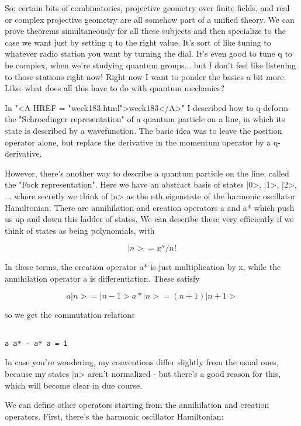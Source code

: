 So: certain bits of combinatorics, projective geometry over finite
fields, and real or complex projective geometry are all somehow part
of a unified theory.  We can prove theorems simultaneously for all
these subjects and then specialize to the case we want just by setting
q to the right value.  It's sort of like tuning to whatever radio
station you want by turning the dial.  It's even good to tune q to 
be complex, when we're studying quantum groups... but I don't feel like
listening to those stations right now!  Right now I want to ponder 
the basics a bit more.  Like: what does all this have to do with quantum 
mechanics?

In "<A HREF = "week183.html">week183</A>" I described how to q-deform the "Schroedinger
representation" of a quantum particle on a line, in which its state is
described by a wavefunction.  The basic idea was to leave the position
operator alone, but replace the derivative in the momentum operator by
a q-derivative.

However, there's another way to describe a quantum particle on the
line, called the "Fock representation".  Here we have an abstract
basis of states |0>, |1>, |2>, ... where secretly we think of |n> as
the nth eigenstate of the harmonic oscillator Hamiltonian.  There are
annihilation and creation operators a and a* which push us up and down
this ladder of states.  We can describe these very efficiently if
we think of states as being polynomials, with


$$

|n> = x^{n} / n!
$$
    
In these terms, the creation operator a* is just multiplication by x,
while the annihilation operator a is differentiation.  These satisfy

$$

 a|n>  =        |n-1>
a*|n>  =  (n+1) |n+1>
$$
    
so we get the commutation relations

\begin{verbatim}

a a* - a* a = 1 
\end{verbatim}
    
In case you're wondering, my conventions differ slightly from the
usual ones, because my states |n> aren't normalized - but there's a
good reason for this, which will become clear in due course.  

We can define other operators starting from the annihilation and
creation operators.  First, there's the harmonic oscillator Hamiltonian:


